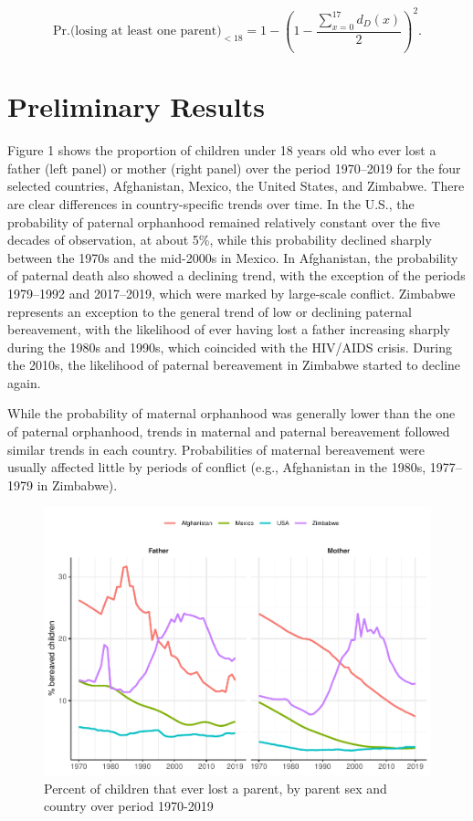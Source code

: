 \documentclass[
  11pt,
  letterpaper,
]{article}
\begin{document}
\[\text{Pr.(losing at least one parent)}_{<18} = 1 - \left(1-\frac{\sum^{17}_{x=0}d_D(x)}{2}\right)^2.\]

\hypertarget{preliminary-results}{%
\section{Preliminary Results}\label{preliminary-results}}

Figure 1 shows the proportion of children under 18 years old who ever lost a father (left panel) or mother (right panel) over the period 1970--2019 for the four selected countries, Afghanistan, Mexico, the United States, and Zimbabwe. There are clear differences in country-specific trends over time. In the U.S., the probability of paternal orphanhood remained relatively constant over the five decades of observation, at about 5\%, while this probability declined sharply between the 1970s and the mid-2000s in Mexico. In Afghanistan, the probability of paternal death also showed a declining trend, with the exception of the periods 1979--1992 and 2017--2019, which were marked by large-scale conflict. Zimbabwe represents an exception to the general trend of low or declining paternal bereavement, with the likelihood of ever having lost a father increasing sharply during the 1980s and 1990s, which coincided with the HIV/AIDS crisis. During the 2010s, the likelihood of paternal bereavement in Zimbabwe started to decline again.

While the probability of maternal orphanhood was generally lower than the one of paternal orphanhood, trends in maternal and paternal bereavement followed similar trends in each country. Probabilities of maternal bereavement were usually affected little by periods of conflict (e.g., Afghanistan in the 1980s, 1977--1979 in Zimbabwe).

\begin{figure}
\centering
\includegraphics{parental_loss_global_paa_ext_abstract_files/figure-latex/perc-ber-all-1.pdf}
\caption{\label{fig:perc-ber-all}Percent of children that ever lost a parent, by parent sex and country over period 1970-2019}
\end{figure}
\end{document}
